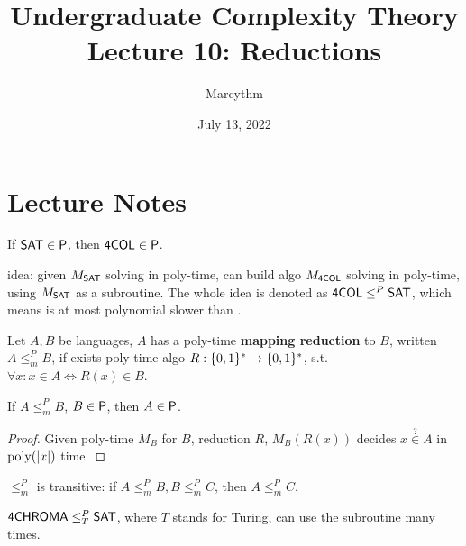 \documentclass{article}
\title{Undergraduate Complexity Theory \\ Lecture 10: Reductions}
\author{Marcythm}
\date{July 13, 2022}
\begin{document}
\maketitle{}

\section{Lecture Notes}

\begin{theorem}
  If \(\prob{SAT} \in \P\), then \(\prob{4COL} \in \P\).
\end{theorem}

idea: given \(M_{\prob{SAT}}\) solving  in poly-time, can build algo \(M_{\prob{4COL}}\) solving  in poly-time, using \(M_{\prob{SAT}}\) as a subroutine. The whole idea is denoted as \( \prob{4COL} \leq^P \prob{SAT} \), which means  is at most polynomial slower than .

\begin{definition}
  Let \(A, B\) be languages, \(A\) has a poly-time {\bf mapping reduction} to \(B\), written \(A \leq_m^P B\), if exists poly-time algo \(R: \setof{0, 1}^* \to \setof{0, 1}^*\), s.t. \(\forall x: x \in A \iff R(x) \in B\).
\end{definition}

\begin{theorem}
  If \(A \leq_m^P B\), \(B \in \P\), then \(A \in \P\).
\end{theorem}

\begin{proof}
  Given poly-time \(M_B\) for \(B\), reduction \(R\), \(M_B(R(x))\) decides \(x \overset{?}{\in} A\) in \(\poly(|x|)\) time.
\end{proof}

\begin{theorem}
  \(\leq_m^P\) is transitive: if \(A \leq_m^P B, B \leq_m^P C\), then \(A \leq_m^P C\).
\end{theorem}


\begin{claim}
  \( \prob{4CHROMA} \leq_T^P \prob{SAT} \), where \(T\) stands for Turing, can use the subroutine many times.
\end{claim}
\end{document}
